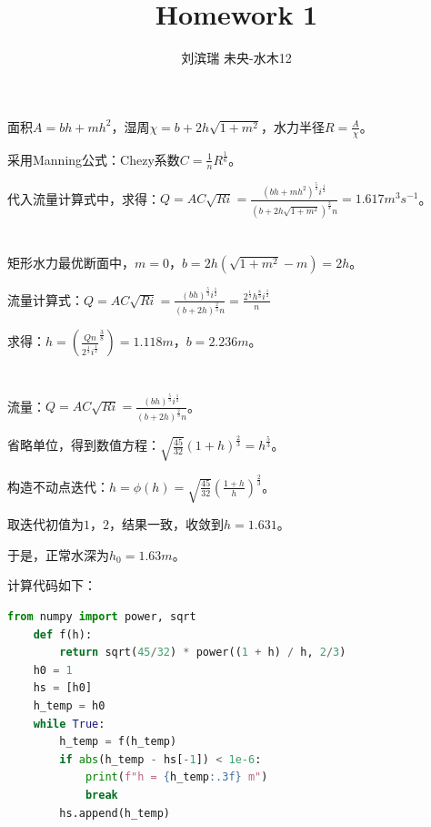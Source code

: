 \documentclass[12pt, a4paper]{article}
\title{{\Huge{\textbf{Homework 1 \\}}}}
\author{刘滨瑞 \quad 2021012579 \quad 未央-水木12}
\begin{document}
\maketitle

    \section{}

        面积$A = bh + mh^2$，湿周$\chi = b + 2h \sqrt{1 + m^2}$，水力半径$R = \frac{A}{\chi}$。

        采用Manning公式：Chezy系数$C = \frac{1}{n} R^{\frac{1}{6}}$。

        代入流量计算式中，求得：$Q = A C \sqrt{R i} = \frac{(b h + m h^2)^{\frac{5}{3}} i^{\frac{1}{2}}}{(b + 2h \sqrt{1 + m^2})^{\frac{2}{3}} n} = 1.617 m^3 s^{-1}$。

    \section{}

        矩形水力最优断面中，$m = 0$，$b = 2 h (\sqrt{1 + m^2} - m) = 2 h$。

        流量计算式：$Q = A C \sqrt{R i} = \frac{(b h)^{\frac{5}{3}} i^{\frac{1}{2}}}{(b + 2h)^{\frac{2}{3}} n} = \frac{2^{\frac{1}{3}} h^{\frac{8}{3}} i^{\frac{1}{2}}}{n}$

        求得：$h = (\frac{Q n}{2^{\frac{1}{3}} i^{\frac{1}{2}}}^{\frac{3}{8}}) = 1.118 m$，$b = 2.236 m$。

    \section{}

        流量：$Q = A C \sqrt{R i} = \frac{(b h)^{\frac{5}{3}} i^{\frac{1}{2}}}{(b + 2h)^{\frac{2}{3}} n}$。

        省略单位，得到数值方程：$\sqrt{\frac{45}{32}} (1 + h)^{\frac{2}{3}} = h^{\frac{5}{3}}$。

        构造不动点迭代：$h = \phi (h) = \sqrt{\frac{45}{32}} (\frac{1 + h}{h})^{\frac{2}{3}}$。

        取迭代初值为$1$，$2$，结果一致，收敛到$h = 1.631$。

        于是，正常水深为$h_0 = 1.63 m$。

        计算代码如下：

        \begin{lstlisting}[language=Python]
    from numpy import power, sqrt
    def f(h):
        return sqrt(45/32) * power((1 + h) / h, 2/3)
    h0 = 1
    hs = [h0]
    h_temp = h0
    while True:
        h_temp = f(h_temp)
        if abs(h_temp - hs[-1]) < 1e-6:
            print(f"h = {h_temp:.3f} m")
            break
        hs.append(h_temp)
        \end{lstlisting}
\end{document}
